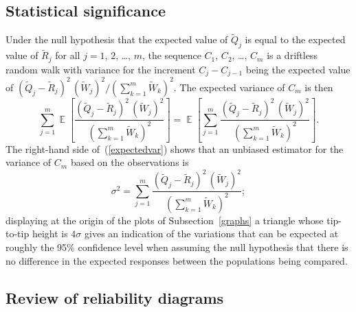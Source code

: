 \documentclass{article}
\DeclareMathOperator{\E}{\mathop{}\mathbb{E}}
\begin{document}
\subsection{Statistical significance}
\label{significance}

Under the null hypothesis that the expected value of $\tilde{Q}_j$
is equal to the expected value of $\tilde{R}_j$
for all $j = 1$, $2$, \dots, $m$,
the sequence $C_1$, $C_2$, \dots, $C_m$ is a driftless random walk
with variance for the increment $C_j - C_{j-1}$ being the expected value of
$(\tilde{Q}_j - \tilde{R}_j)^2 \, (\tilde{W}_j)^2
/(\sum_{k=1}^m \tilde{W}_k)^2$.
The expected variance of $C_m$ is then
%
\begin{equation}
\label{expectedvar}
\sum_{j=1}^m \E\left[
\frac{(\tilde{Q}_j - \tilde{R}_j)^2 \, (\tilde{W}_j)^2}
     {(\sum_{k=1}^m \tilde{W}_k)^2} \right]
= \E\left[ \sum_{j=1}^m
           \frac{(\tilde{Q}_j - \tilde{R}_j)^2 \, (\tilde{W}_j)^2}
                {(\sum_{k=1}^m \tilde{W}_k)^2} \right].
\end{equation}
%
The right-hand side of~(\ref{expectedvar}) shows that an unbiased estimator
for the variance of $C_m$ based on the observations is
%
\begin{equation}
\sigma^2 = \sum_{j=1}^m \frac{(\tilde{Q}_j - \tilde{R}_j)^2 \, (\tilde{W}_j)^2}
                             {(\sum_{k=1}^m \tilde{W}_k)^2};
\end{equation}
%
displaying at the origin of the plots of Subsection~\ref{graphs}
a triangle whose tip-to-tip height is $4\sigma$ gives
an indication of the variations that can be expected
at roughly the 95\% confidence level when assuming the null hypothesis
that there is no difference in the expected responses
between the populations being compared.


\subsection{Review of reliability diagrams}
\label{reliadia}
\end{document}

